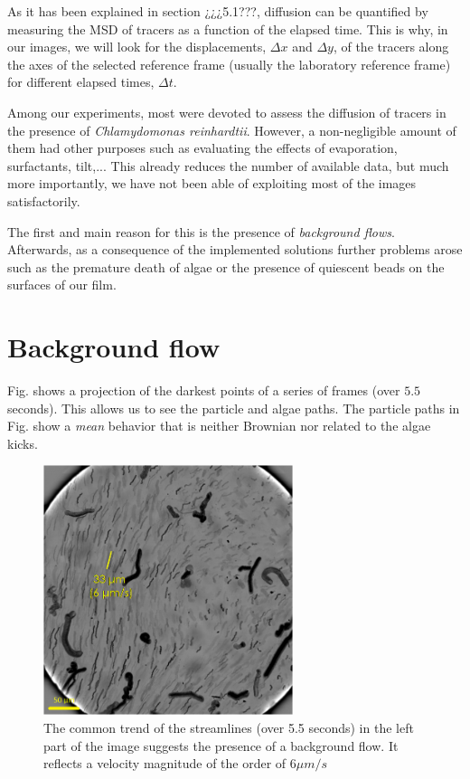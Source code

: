 As it has been explained in section ¿¿¿5.1???, diffusion can be quantified by measuring the MSD of tracers as a function of the elapsed time. This is why, in our images, we will look for the displacements, $\Delta x$ and $\Delta y$, of the tracers along the axes of the selected reference frame (usually the laboratory reference frame) for different elapsed times, $\Delta t$.

Among our experiments, most were devoted to assess the diffusion of tracers in the presence of \textit{Chlamydomonas reinhardtii}. However, a non-negligible amount of them had other purposes such as evaluating the effects of evaporation, surfactants, tilt,... This already reduces the number of available data, but much more importantly, we have not been able of exploiting most of the images satisfactorily.

The first and main reason for this is the presence of \textit{background flows}. Afterwards, as a consequence of the implemented solutions further problems arose such as the premature death of algae or the presence of quiescent beads on the surfaces of our film.

\section{Background flow}

Fig. \label{backg_flow} shows a projection of the darkest points of a series of frames (over $5.5$ seconds). This allows us to see the particle and algae paths.
The particle paths in Fig. \label{backg_flow} show a \textit{mean} behavior that is neither Brownian nor related to the algae kicks.

\begin{figure}[H]
	\centering
	\includegraphics[width=0.65\textwidth]{archivos/backg_flow.png}
	\caption{The common trend of the streamlines (over 5.5 seconds) in the left part of the image suggests the presence of a background flow. It reflects a velocity magnitude of the order of $6 \mu m / s$}
	\label{backg_flow}
\end{figure}

